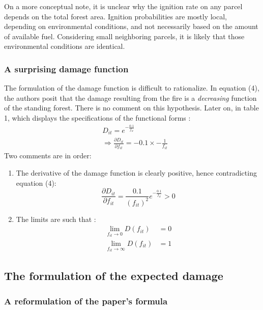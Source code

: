 \documentclass[
]{article}
\begin{document}
On a more conceptual note, it is unclear why the ignition rate on any
parcel depends on the total forest area. Ignition probabilities are
mostly local, depending on environmental conditions, and not necessarily
based on the amount of available fuel. Considering small neighboring
parcels, it is likely that those environmental conditions are identical.

\hypertarget{a-surprising-damage-function}{%
\subsubsection{A surprising damage
function}\label{a-surprising-damage-function}}

The formulation of the damage function is difficult to rationalize. In
equation (4), the authors posit that the damage resulting from the fire
is a \textit{decreasing} function of the standing forest. There is no
comment on this hypothesis. Later on, in table 1, which displays the
specifications of the functional forms : \begin{align*}
& D_{it}=e^{-\frac{0.1}{f_{it}}}\\
& \Rightarrow \frac{\partial D_{it}}{\partial f_{it}}=-0.1\times -\frac{1}{f_{it}}
\end{align*} Two comments are in order:

\begin{enumerate}
    \item The derivative of the damage function is clearly positive, hence contradicting equation (4):
    \begin{equation*}
        \frac{\partial D_{it}}{\partial f_{it}}=\frac{0.1}{(f_{it})^2}e^{-\frac{0.1}{f_{it}}}>0
    \end{equation*}
    \item The limits are such that : 
    \begin{align*}
        \lim_{f_{it} \to 0}D(f_{it})&=0\\
        \lim_{f_{it} \to \infty}D(f_{it})&=1
    \end{align*}
\end{enumerate}

\hypertarget{the-formulation-of-the-expected-damage}{%
\subsection{The formulation of the expected
damage}\label{the-formulation-of-the-expected-damage}}

\hypertarget{a-reformulation-of-the-papers-formula}{%
\subsubsection{A reformulation of the paper's
formula}\label{a-reformulation-of-the-papers-formula}}
\end{document}
